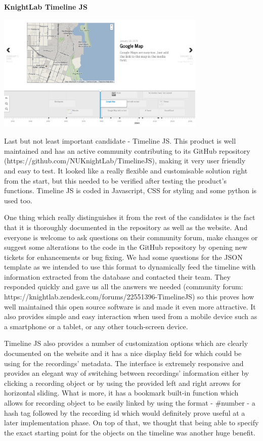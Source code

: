 \documentclass{l3proj}
\begin{document}
\textbf{KnightLab Timeline JS}

\includegraphics[width=0.75\textwidth]{images/timeline-example.png}

Last but not least important candidate - Timeline JS. This product is well maintained and has an active community contributing to its GitHub repository (https://github.com/NUKnightLab/TimelineJS), making it very user friendly and easy to test. It looked like a really flexible and customisable solution right from the start, but this needed to be verified after testing the product's functions. Timeline JS is coded in Javascript, CSS for styling and some python is used too.

One thing which really distinguishes it from the rest of the candidates is the fact that it is thoroughly documented in the repository as well as the website. And everyone is welcome to ask questions on their community forum, make changes or suggest some alterations to the code in the GitHub repository by opening new tickets for enhancements or bug fixing. We had some questions for the JSON template as we intended to use this format to dynamically feed the timeline with information extracted from the database and contacted their team. They responded quickly and gave us all the answers we needed (community forum: https://knightlab.zendesk.com/forums/22551396-TimelineJS) so this proves how well maintained this open source software is and made it even more attractive. It also provides simple and easy interaction when used from a mobile device such as a smartphone or a tablet, or any other touch-screen device.

Timeline JS also provides a number of customization options which are clearly documented on the website and it has a nice display field for which could be using for the recordings' metadata. The interface is extremely responsive and provides an elegant way of switching between recordings' information either by clicking a recording object or by using the provided left and right arrows for horizontal sliding. What is more, it has a bookmark built-in function which allows for recording object to be easily linked by using the format - #number - a hash tag followed by the recording id which would definitely prove useful at a later implementation phase. On top of that, we thought that being able to specify the exact starting point for the objects on the timeline was another huge benefit.
\end{document}
